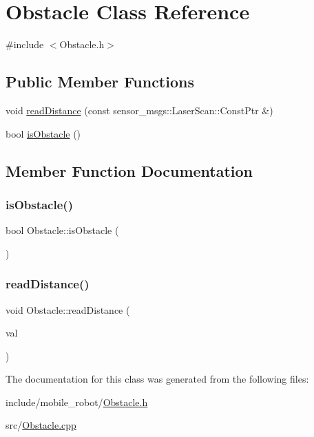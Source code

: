 \hypertarget{classObstacle}{}\section{Obstacle Class Reference}
\label{classObstacle}


{\ttfamily \#include $<$Obstacle.\+h$>$}

\subsection*{Public Member Functions}
\begin{DoxyCompactItemize}
\item 
void \hyperlink{classObstacle_ab8ddfe4b57a944bd85a3c43d673a4fa2}{read\+Distance} (const sensor\+\_\+msgs\+::\+Laser\+Scan\+::\+Const\+Ptr \&)
\item 
bool \hyperlink{classObstacle_ae73d79d4676fc27c4a9507c8dc8c7719}{is\+Obstacle} ()
\end{DoxyCompactItemize}


\subsection{Member Function Documentation}
\mbox{\label{classObstacle_ae73d79d4676fc27c4a9507c8dc8c7719}} 
\subsubsection{\texorpdfstring{is\+Obstacle()}{isObstacle()}}
{\footnotesize\ttfamily bool Obstacle\+::is\+Obstacle (\begin{DoxyParamCaption}{ }\end{DoxyParamCaption})}

\mbox{\label{classObstacle_ab8ddfe4b57a944bd85a3c43d673a4fa2}} 
\subsubsection{\texorpdfstring{read\+Distance()}{readDistance()}}
{\footnotesize\ttfamily void Obstacle\+::read\+Distance (\begin{DoxyParamCaption}\item[{const sensor\+\_\+msgs\+::\+Laser\+Scan\+::\+Const\+Ptr \&}]{val }\end{DoxyParamCaption})}



The documentation for this class was generated from the following files\+:\begin{DoxyCompactItemize}
\item 
include/mobile\+\_\+robot/\hyperlink{Obstacle_8h}{Obstacle.\+h}\item 
src/\hyperlink{Obstacle_8cpp}{Obstacle.\+cpp}\end{DoxyCompactItemize}

